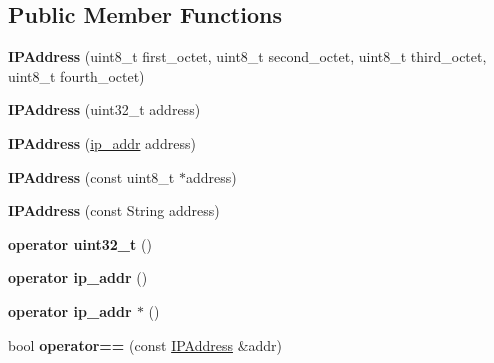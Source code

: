 \subsection*{Public Member Functions}
\begin{DoxyCompactItemize}
\item 
\hypertarget{class_i_p_address_af25acf9a16981a1b95c66e9e683245b0}{}{\bfseries I\+P\+Address} (uint8\+\_\+t first\+\_\+octet, uint8\+\_\+t second\+\_\+octet, uint8\+\_\+t third\+\_\+octet, uint8\+\_\+t fourth\+\_\+octet)\label{class_i_p_address_af25acf9a16981a1b95c66e9e683245b0}

\item 
\hypertarget{class_i_p_address_a9acd9971a8fc47fa51681e9b9a95b511}{}{\bfseries I\+P\+Address} (uint32\+\_\+t address)\label{class_i_p_address_a9acd9971a8fc47fa51681e9b9a95b511}

\item 
\hypertarget{class_i_p_address_a41fef26d1776762bb1e25cd23278ada8}{}{\bfseries I\+P\+Address} (\hyperlink{structip__addr}{ip\+\_\+addr} address)\label{class_i_p_address_a41fef26d1776762bb1e25cd23278ada8}

\item 
\hypertarget{class_i_p_address_ab747742c0a428a369f6ab73b7d28c306}{}{\bfseries I\+P\+Address} (const uint8\+\_\+t $\ast$address)\label{class_i_p_address_ab747742c0a428a369f6ab73b7d28c306}

\item 
\hypertarget{class_i_p_address_afb9b73e257da0169b7ffcb5d8122a9f7}{}{\bfseries I\+P\+Address} (const String address)\label{class_i_p_address_afb9b73e257da0169b7ffcb5d8122a9f7}

\item 
\hypertarget{class_i_p_address_a90aebdb7f5f655fe3a5e3d8aa3bc3ac8}{}{\bfseries operator uint32\+\_\+t} ()\label{class_i_p_address_a90aebdb7f5f655fe3a5e3d8aa3bc3ac8}

\item 
\hypertarget{class_i_p_address_a5e05f9ca93074e4413225a70bda15174}{}{\bfseries operator ip\+\_\+addr} ()\label{class_i_p_address_a5e05f9ca93074e4413225a70bda15174}

\item 
\hypertarget{class_i_p_address_a99483365155bf097dd937594b372cf04}{}{\bfseries operator ip\+\_\+addr $\ast$} ()\label{class_i_p_address_a99483365155bf097dd937594b372cf04}

\item 
\hypertarget{class_i_p_address_adc404569f7c8193c1be9d79a27753099}{}bool {\bfseries operator==} (const \hyperlink{class_i_p_address}{I\+P\+Address} \&addr)\label{class_i_p_address_adc404569f7c8193c1be9d79a27753099}


\end{DoxyCompactItemize}
